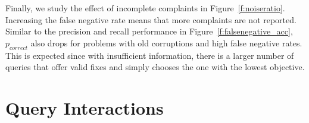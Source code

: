 Finally, we study the effect of incomplete complaints in
Figure~\ref{f:noiseratio}. Increasing the false negative rate means that more
complaints are not reported. Similar to the precision and recall performance
in Figure~\ref{f:falsenegative_acc}, $p_{correct}$ also drops for problems
with old corruptions and high false negative rates. This is expected since
with insufficient information, there is a larger number of queries that offer
valid fixes and \sys simply chooses the one with the lowest objective. 






% 
% 


\section{Query Interactions} \label{app:selectivity}

